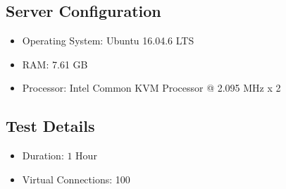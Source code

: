 \documentclass[12pt]{report}
\begin{document}
\subsection{Server Configuration}
\begin{itemize}
	\item Operating System: Ubuntu 16.04.6 LTS
	\item RAM: 7.61 GB
	\item Processor: Intel Common KVM Processor @ 2.095 MHz x 2
\end{itemize}
\subsection{Test Details}
\begin{itemize}
	\item Duration: $1$ Hour
	\item Virtual Connections: 100
\end{itemize}
\end{document}
